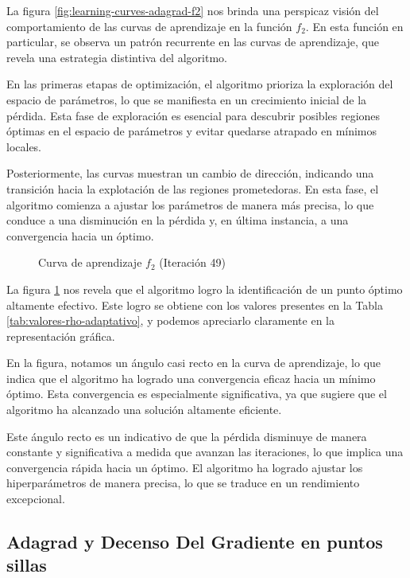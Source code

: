 La figura \ref{fig:learning-curves-adagrad-f2} nos brinda una perspicaz visión del comportamiento de las curvas de aprendizaje en la función $f_2$. En esta función en particular, se observa un patrón recurrente en las curvas de aprendizaje, que revela una estrategia distintiva del algoritmo.

En las primeras etapas de optimización, el algoritmo prioriza la exploración del espacio de parámetros, lo que se manifiesta en un crecimiento inicial de la pérdida. Esta fase de exploración es esencial para descubrir posibles regiones óptimas en el espacio de parámetros y evitar quedarse atrapado en mínimos locales.

Posteriormente, las curvas muestran un cambio de dirección, indicando una transición hacia la explotación de las regiones prometedoras. En esta fase, el algoritmo comienza a ajustar los parámetros de manera más precisa, lo que conduce a una disminución en la pérdida y, en última instancia, a una convergencia hacia un óptimo.

\begin{figure}[h]
  \centering
    
  \caption{Curva de aprendizaje $f_2$ (Iteración 49)}
  \captionsetup{justification=centering}
  \label{fig:learning-adagrad-f2-49}
\end{figure}

La figura \ref{fig:learning-adagrad-f2-49} nos revela que el algoritmo logro la  identificación de un punto óptimo altamente efectivo. Este logro se obtiene con los valores presentes en la Tabla \ref{tab:valores-rho-adaptativo}, y podemos apreciarlo claramente en la representación gráfica.

En la figura, notamos un ángulo casi recto en la curva de aprendizaje, lo que indica que el algoritmo ha logrado una convergencia eficaz hacia un mínimo óptimo. Esta convergencia es especialmente significativa, ya que sugiere que el algoritmo ha alcanzado una solución altamente eficiente.

Este ángulo recto es un indicativo de que la pérdida disminuye de manera constante y significativa a medida que avanzan las iteraciones, lo que implica una convergencia rápida hacia un óptimo. El algoritmo ha logrado ajustar los hiperparámetros de manera precisa, lo que se traduce en un rendimiento excepcional.
\clearpage
\subsection{Adagrad y Decenso Del Gradiente en puntos sillas}

